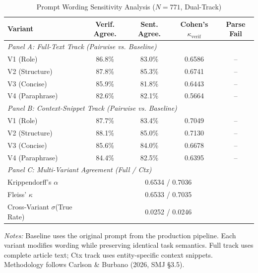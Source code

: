 \begin{table}[htbp]
\centering
\caption{Prompt Wording Sensitivity Analysis ($N=771$, Dual-Track)}
\label{tab:prompt_sensitivity}
\begin{tabular}{lcccc}
\hline
Variant & Verif. Agree. & Sent. Agree. & Cohen's $\kappa_{\text{verif}}$ & Parse Fail \\
\hline
\multicolumn{5}{l}{\textit{Panel A: Full-Text Track (Pairwise vs. Baseline)}} \\
\quad V1 (Role) & 86.8\% & 83.0\% & 0.6586 & -- \\
\quad V2 (Structure) & 87.8\% & 85.3\% & 0.6741 & -- \\
\quad V3 (Concise) & 85.9\% & 81.8\% & 0.6443 & -- \\
\quad V4 (Paraphrase) & 82.6\% & 82.1\% & 0.5664 & -- \\
\hline
\multicolumn{5}{l}{\textit{Panel B: Context-Snippet Track (Pairwise vs. Baseline)}} \\
\quad V1 (Role) & 87.7\% & 83.4\% & 0.7049 & -- \\
\quad V2 (Structure) & 88.1\% & 85.0\% & 0.7130 & -- \\
\quad V3 (Concise) & 85.6\% & 84.0\% & 0.6678 & -- \\
\quad V4 (Paraphrase) & 84.4\% & 82.5\% & 0.6395 & -- \\
\hline
\multicolumn{5}{l}{\textit{Panel C: Multi-Variant Agreement (Full / Ctx)}} \\
\quad Krippendorff's $\alpha$ & \multicolumn{4}{c}{0.6534 / 0.7036} \\
\quad Fleiss' $\kappa$ & \multicolumn{4}{c}{0.6533 / 0.7035} \\
\quad Cross-Variant $\sigma$(True Rate) & \multicolumn{4}{c}{0.0252 / 0.0246} \\
\hline
\end{tabular}
\par\smallskip\footnotesize
\textit{Notes:} Baseline uses the original prompt from the production pipeline.
Each variant modifies wording while preserving identical task semantics.
Full track uses complete article text; Ctx track uses entity-specific context snippets.
Methodology follows Carlson \& Burbano (2026, SMJ \S3.5).
\end{table}
